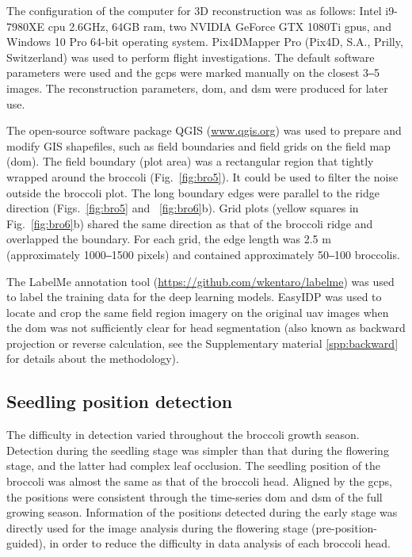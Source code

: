 The configuration of the computer for 3D reconstruction was as follows: Intel  i9-7980XE \gls{cpu} \@2.6GHz, 64GB \gls{ram}, two NVIDIA GeForce GTX 1080Ti \gls{gpu}s, and Windows 10 Pro 64-bit operating system. Pix4DMapper Pro (Pix4D, S.A., Prilly, Switzerland) was used to perform flight investigations. The default software parameters were used and the \gls{gcp}s were marked manually on the closest 3‒5 images. The reconstruction parameters, \gls{dom}, and \gls{dsm} were produced for later use. 

The open-source software package QGIS (\url{www.qgis.org}) was used to prepare and modify GIS shapefiles, such as field boundaries and field grids on the field map (\gls{dom}). The field boundary (plot area) was a rectangular region that tightly wrapped around the broccoli (Fig.~\ref{fig:bro5}). It could be used to filter the noise outside the broccoli plot. The long boundary edges were parallel to the ridge direction (Figs.~\ref{fig:bro5} and ~\ref{fig:bro6}b). Grid plots (yellow squares in Fig.~\ref{fig:bro6}b) shared the same direction as that of the broccoli ridge and overlapped the boundary. For each grid, the edge length was 2.5 m (approximately 1000‒1500 pixels) and contained approximately 50‒100 broccolis. 



The LabelMe annotation tool (\url{https://github.com/wkentaro/labelme}) was used to label the training data for the deep learning models. EasyIDP \citep[\url{https://github.com/UTokyo-FieldPhenomics-Lab/EasyIDP}]{wang_easyidp_2021} was used to locate and crop the same field region imagery on the original \gls{uav} images when the \gls{dom} was not sufficiently clear for head segmentation (also known as backward projection or reverse calculation, see the Supplementary material \ref{spp:backward} for details about the methodology).

\subsection{Seedling position detection}

The difficulty in detection varied throughout the broccoli growth season. Detection during the seedling stage was simpler than that during the flowering stage, and the latter had complex leaf occlusion. The seedling position of the broccoli was almost the same as that of the broccoli head. Aligned by the \gls{gcp}s, the positions were consistent through the time-series \gls{dom} and \gls{dsm} of the full growing season. Information of the positions detected during the early stage was directly used for the image analysis during the flowering stage (pre-position-guided), in order to reduce the difficulty in data analysis of each broccoli head.

